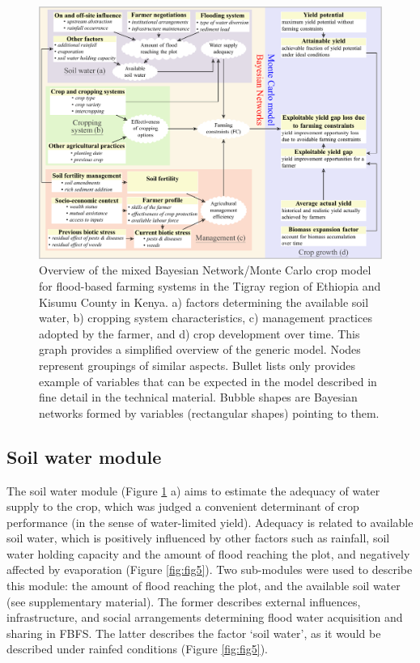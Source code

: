 \documentclass[]{elsarticle} %
\begin{document}
\begin{figure}[!h]

{\centering \includegraphics[width=1\linewidth,]{figures/fig4-plot-1} 

}

\caption{Overview of the mixed Bayesian Network/Monte Carlo crop model for flood-based farming systems in the Tigray region of Ethiopia and Kisumu County in Kenya. a) factors determining the available soil water, b) cropping system characteristics, c) management practices adopted by the farmer, and d) crop development over time. This graph provides a simplified overview of the generic model. Nodes represent groupings of similar aspects. Bullet lists only provides example of variables that can be expected in the model described in fine detail in the technical material. Bubble shapes are Bayesian networks formed by variables (rectangular shapes) pointing to them.}\label{fig:fig4}
\end{figure}

\hypertarget{ref42}{%
\subsection{Soil water module}\label{ref42}}

The soil water module (Figure \ref{fig:fig4} a) aims to estimate the adequacy of water supply to the crop, which was judged a convenient determinant of crop performance (in the sense of water-limited yield). Adequacy is related to available soil water, which is positively influenced by other factors such as rainfall, soil water holding capacity and the amount of flood reaching the plot, and negatively affected by evaporation (Figure \ref{fig:fig5}). Two sub-modules were used to describe this module: the amount of flood reaching the plot, and the available soil water (see supplementary material). The former describes external influences, infrastructure, and social arrangements determining flood water acquisition and sharing in FBFS. The latter describes the factor `soil water', as it would be described under rainfed conditions (Figure \ref{fig:fig5}).
\end{document}
